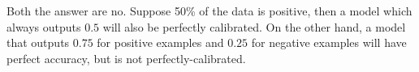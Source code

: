 \begin{answer}
    Both the answer are no. Suppose 50\% of the data is positive, then a model which always outputs $0.5$ will also be perfectly calibrated. On the other hand, a model that outputs $0.75$ for positive examples and $0.25$ for negative examples will have perfect accuracy, but is not perfectly-calibrated.
\end{answer}
